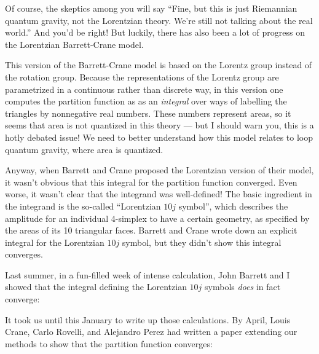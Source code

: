 \documentclass{article}
\def\tightlist{}
\renewcommand{\texttt}[1]{%
  \begingroup
  \ttfamily
  \begingroup\lccode`~=`/\lowercase{\endgroup\def~}{/\discretionary{}{}{}}%
  \begingroup\lccode`~=`[\lowercase{\endgroup\def~}{[\discretionary{}{}{}}%
  \begingroup\lccode`~=`.\lowercase{\endgroup\def~}{.\discretionary{}{}{}}%
  \catcode`/=\active\catcode`[=\active\catcode`.=\active
  \scantokens{#1\noexpand}%
  \endgroup
}
\begin{document}
Of course, the skeptics among you will say ``Fine, but this is just
Riemannian quantum gravity, not the Lorentzian theory. We're still not
talking about the real world.'' And you'd be right! But luckily, there
has also been a lot of progress on the Lorentzian Barrett-Crane model.

This version of the Barrett-Crane model is based on the Lorentz group
instead of the rotation group. Because the representations of the
Lorentz group are parametrized in a continuous rather than discrete way,
in this version one computes the partition function as as an
\emph{integral} over ways of labelling the triangles by nonnegative real
numbers. These numbers represent areas, so it seems that area is not
quantized in this theory --- but I should warn you, this is a hotly
debated issue! We need to better understand how this model relates to
loop quantum gravity, where area is quantized.

Anyway, when Barrett and Crane proposed the Lorentzian version of their
model, it wasn't obvious that this integral for the partition function
converged. Even worse, it wasn't clear that the integrand was
well-defined! The basic ingredient in the integrand is the so-called
``Lorentzian \(10j\) symbol'', which describes the amplitude for an
individual 4-simplex to have a certain geometry, as specified by the
areas of its 10 triangular faces. Barrett and Crane wrote down an
explicit integral for the Lorentzian \(10j\) symbol, but they didn't
show this integral converges.

Last summer, in a fun-filled week of intense calculation, John Barrett
and I showed that the integral defining the Lorentzian \(10j\) symbols
\emph{does} in fact converge:


It took us until this January to write up those calculations. By April,
Louis Crane, Carlo Rovelli, and Alejandro Perez had written a paper
extending our methods to show that the partition function converges:

\end{document}
